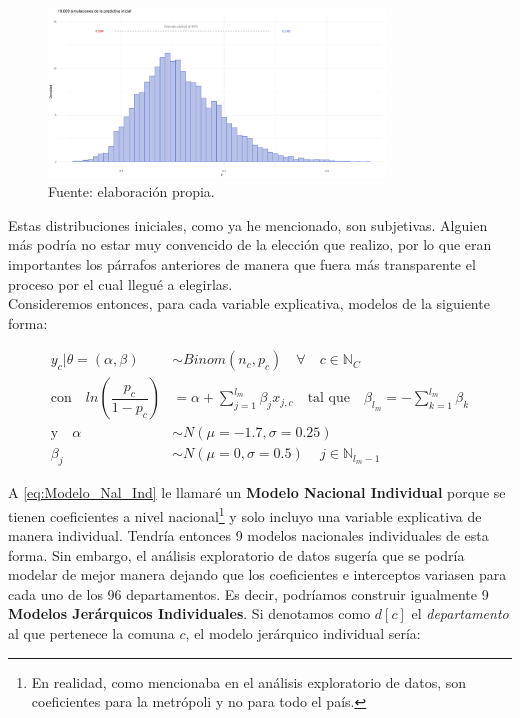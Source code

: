\begin{figure}[h]
	\centering
	\includegraphics[width = 0.8\textwidth]{Figs/Modelado/Pred_Inicial}
	\caption{Fuente: elaboración propia.}
	\label{fig:Predictiva_Inicial}
\end{figure}

Estas distribuciones iniciales, como ya he mencionado, son subjetivas. Alguien más podría no estar muy convencido de la elección que realizo, por lo que eran importantes los párrafos anteriores de manera que fuera más transparente el proceso por el cual llegué a elegirlas.\\  

Consideremos entonces, para cada variable explicativa, modelos de la siguiente forma:

\begin{align}\label{eq:Modelo_Nal_Ind}
y_c|\theta=(\alpha,\beta) & \sim Binom(n_c,p_c) \quad \forall \quad c \in \mathbb{N}_C \nonumber \\
\text{con} \quad ln\left(\dfrac{p_c}{1-p_c}\right) &= \alpha + \sum\limits_{j=1}^{l_m} \beta_j x_{j,c} \quad \text{tal que} \quad \beta_{l_m} = -\sum\limits_{k = 1}^{l_m} \beta_k \nonumber \\
\text{y} \quad \alpha & \sim N(\mu = -1.7,\sigma = 0.25) \nonumber \\
\beta_j & \sim N(\mu = 0,\sigma = 0.5) \quad \, j \in \mathbb{N}_{l_m-1} 
\end{align}

A \eqref{eq:Modelo_Nal_Ind} le llamaré un \textbf{Modelo Nacional Individual} porque se tienen coeficientes a nivel nacional\footnote{En realidad, como mencionaba en el análisis exploratorio de datos, son coeficientes para la metrópoli y no para todo el país.} y solo incluyo una variable explicativa de manera individual. Tendría entonces 9 modelos nacionales individuales de esta forma. Sin embargo, el análisis exploratorio de datos sugería que se podría modelar de mejor manera dejando que los coeficientes e interceptos variasen para cada uno de los 96 departamentos. Es decir, podríamos construir igualmente 9 \textbf{Modelos Jerárquicos Individuales}. Si denotamos como $d[c]$ el \textit{departamento} al que pertenece la comuna $c$, el modelo jerárquico individual sería: 

